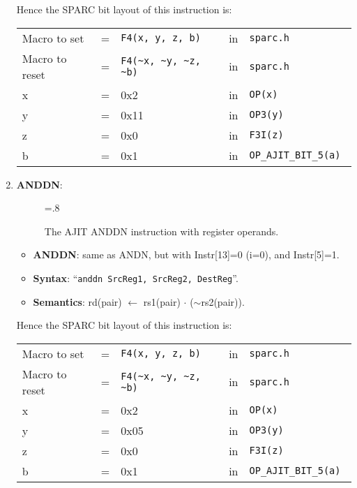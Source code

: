 \begin{enumerate}
  Hence the SPARC bit layout of this instruction is:

  \begin{tabular}[h]{lclcl}
    Macro to set   &=&  \verb|F4(x, y, z, b)|     &in& \verb|sparc.h|     \\
    Macro to reset &=&  \verb|F4(~x, ~y, ~z, ~b)| &in& \verb|sparc.h|     \\
    x              &=& 0x2                        &in& \verb|OP(x) | \\
    y              &=& 0x11                       &in& \verb|OP3(y) | \\
    z              &=& 0x0                        &in& \verb|F3I(z) | \\
    b              &=& 0x1                        &in& \verb|OP_AJIT_BIT_5(a) |
  \end{tabular}

\item \textbf{ANDDN}:\\
  \begin{center}
    \begin{figure}[h]
      \centering
      \epsfxsize=.8\linewidth
      \caption{The AJIT ANDDN instruction  with register operands.}
      \label{fig:ajit:anddn:insn}
    \end{figure}
  \end{center}
  \begin{itemize}
  \item []\textbf{ANDDN}: same as ANDN, but with Instr[13]=0 (i=0), and
    Instr[5]=1.
  \item []\textbf{Syntax}: ``\texttt{anddn  SrcReg1, SrcReg2, DestReg}''.
  \item []\textbf{Semantics}: rd(pair) $\leftarrow$ rs1(pair) $\cdot$ ($\sim$rs2(pair)).
  \end{itemize}

  Hence the SPARC bit layout of this instruction is:

  \begin{tabular}[h]{lclcl}
    Macro to set   &=&  \verb|F4(x, y, z, b)|     &in& \verb|sparc.h|     \\
    Macro to reset &=&  \verb|F4(~x, ~y, ~z, ~b)| &in& \verb|sparc.h|     \\
    x              &=& 0x2                        &in& \verb|OP(x) | \\
    y              &=& 0x05                       &in& \verb|OP3(y) | \\
    z              &=& 0x0                        &in& \verb|F3I(z) | \\
    b              &=& 0x1                        &in& \verb|OP_AJIT_BIT_5(a) |
  \end{tabular}


\end{enumerate}
